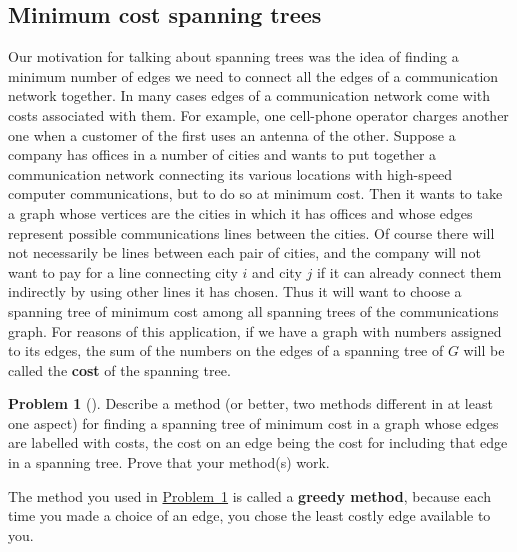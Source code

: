 \documentclass[10pt,]{book}
\newcommand{\terminology}[1]{\textbf{#1}}
\theoremstyle{plain}
\theoremstyle{definition}
\newtheorem{activity}[project]{Problem}
\theoremstyle{definition}
\numberwithin{equation}{chapter}
\newcommand{\importantarrow}{\Rightarrow}
\begin{document}
\subsection[{Minimum cost spanning trees}]{Minimum cost spanning trees}\label{subsection-25}
Our motivation for talking about spanning trees was the idea of finding a minimum number of edges we need to connect all the edges of a communication network together. In many cases edges of a communication network come with costs associated with them. For example, one cell-phone operator charges another one when a customer of the first uses an antenna of the other. Suppose a company has offices in a number of cities and wants to put together a communication network connecting its various locations with high-speed computer communications, but to do so at minimum cost. Then it wants to take a graph whose vertices are the cities in which it has offices and whose edges represent possible communications lines between the cities. Of course there will not necessarily be lines between each pair of cities, and the company will not want to pay for a line connecting city \(i\) and city \(j\) if it can already connect them indirectly by using other lines it has chosen. Thus it will want to choose a spanning tree of minimum cost among all spanning trees of the communications graph. For reasons of this application, if we have a graph with numbers assigned to its edges, the sum of the numbers on the edges of a spanning tree of \(G\) will be called the \terminology{cost} of the spanning tree.%
\begin{activity}[]\marginsymbol[-1em]{\pdftooltip{$\importantarrow$}{especially interesting}} \label{mincostspantree}
Describe a method (or better, two methods different in at least one aspect) for finding a spanning tree of minimum cost in a graph whose edges are labelled with costs, the cost on an edge being the cost for including that edge in a spanning tree. Prove that your method(s) work.%
\end{activity}
The method you used in \hyperref[mincostspantree]{Problem~\ref{mincostspantree}} is called a \terminology{greedy method}, because each time you made a choice of an edge, you chose the least costly edge available to you.%
\typeout{************************************************}
\typeout{************************************************}
\end{document}
